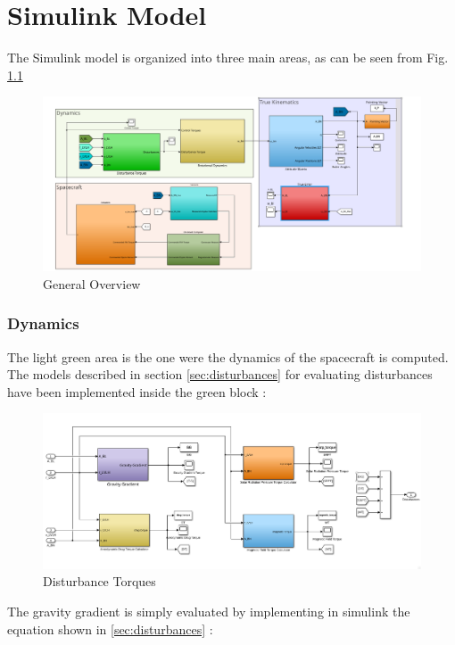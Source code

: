 \documentclass[11pt,a4paper]{report}
\begin{document}
\chapter{Simulink Model}
The Simulink model is organized into three main areas, as can be seen from Fig. \ref{fig:generalovw}

\begin{figure}[H]
 \centering
 \includegraphics[scale=0.4]{gfx/simulink/generalovw.png}
 \caption{General Overview} 
 \label{fig:generalovw}
\end{figure}

\subsection{Dynamics}
The light green area is the one were the dynamics of the spacecraft is computed.
The models described in section \ref{sec:disturbances} for evaluating disturbances have been implemented inside the green block :

\begin{figure}[H]
 \centering
 \includegraphics[scale=0.4]{gfx/simulink/DistrurbanceTorques.png}
 \caption{Disturbance Torques} 
 \label{fig:disturbancetorques}
\end{figure}

The gravity gradient is simply evaluated by implementing in simulink the equation shown in \ref{sec:disturbances} :
\end{document}
